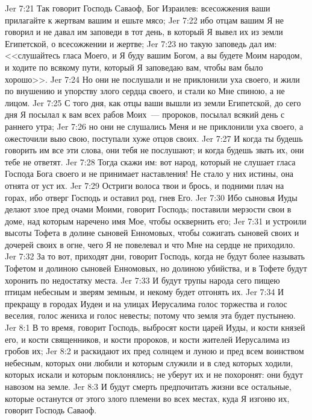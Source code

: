 \rsbpar\vs Jer 7:21 Так говорит Господь Саваоф, Бог Израилев: всесожжения ваши прилагайте к жертвам вашим и ешьте мясо;
\vs Jer 7:22 ибо отцам вашим Я не говорил и не давал им заповеди в тот день, в который Я вывел их из земли Египетской, о всесожжении и жертве;
\vs Jer 7:23 но такую заповедь дал им: <<слушайтесь гласа Моего, и Я буду вашим Богом, а вы будете Моим народом, и ходите по всякому пути, который Я заповедаю вам, чтобы вам было хорошо>>.
\vs Jer 7:24 Но они не послушали и не приклонили уха своего, и жили по внушению и упорству злого сердца своего, и стали ко Мне спиною, а не лицом.
\vs Jer 7:25 С того дня, как отцы ваши вышли из земли Египетской, до сего дня Я посылал к вам всех рабов Моих~--- пророков, посылал всякий день с раннего утра;
\vs Jer 7:26 но они не слушались Меня и не приклонили уха своего, а ожесточили выю свою, поступали хуже отцов своих.
\vs Jer 7:27 И когда ты будешь говорить им все эти слова, они тебя не послушают; и когда будешь звать их, они тебе не ответят.
\vs Jer 7:28 Тогда скажи им: вот народ, который не слушает гласа Господа Бога своего и не принимает наставления! Не стало у них истины, она отнята от уст их.
\vs Jer 7:29 Остриги волоса твои и брось, и подними плач на горах, ибо отверг Господь и оставил род,  гнев Его.
\vs Jer 7:30 Ибо сыновья Иуды делают злое пред очами Моими, говорит Господь; поставили мерзости свои в доме, над которым наречено имя Мое, чтобы осквернить его;
\vs Jer 7:31 и устроили высоты Тофета в долине сыновей Енномовых, чтобы сожигать сыновей своих и дочерей своих в огне, чего Я не повелевал и что Мне на сердце не приходило.
\vs Jer 7:32 За то вот, приходят дни, говорит Господь, когда не будут более называть  Тофетом и долиною сыновей Енномовых, но долиною убийства, и в Тофете будут хоронить по недостатку места.
\vs Jer 7:33 И будут трупы народа сего пищею птицам небесным и зверям земным, и некому будет отгонять их.
\vs Jer 7:34 И прекращу в городах Иудеи и на улицах Иерусалима голос торжества и голос веселия, голос жениха и голос невесты; потому что земля эта будет пустынею.
\vs Jer 8:1 В то время, говорит Господь, выбросят кости царей Иуды, и кости князей его, и кости священников, и кости пророков, и кости жителей Иерусалима из гробов их;
\vs Jer 8:2 и раскидают их пред солнцем и луною и пред всем воинством небесным, которых они любили и которым служили и в след которых ходили, которых искали и которым поклонялись; не уберут их и не похоронят: они будут навозом на земле.
\vs Jer 8:3 И будут смерть предпочитать жизни все остальные, которые останутся от этого злого племени во всех местах, куда Я изгоню их, говорит Господь Саваоф.
